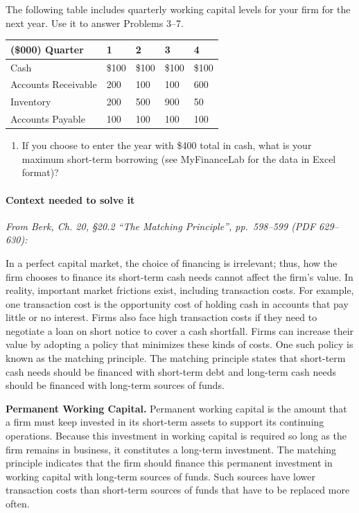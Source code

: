 \documentclass[11pt,a4paper]{article}
\providecommand{\tightlist}{\setlength{\itemsep}{0pt}\setlength{\parskip}{0pt}}
\begin{document}
The following table includes quarterly working capital levels for your firm for the next year. Use
it to answer Problems 3--7.

{\def\LTcaptype{none} %
\begin{longtable}[]{@{}lllll@{}}
\toprule\noalign{}
(\$000) Quarter & 1 & 2 & 3 & 4 \\
\midrule\noalign{}
\endhead
\bottomrule\noalign{}
\endlastfoot
Cash & \$100 & \$100 & \$100 & \$100 \\
Accounts Receivable & 200 & 100 & 100 & 600 \\
Inventory & 200 & 500 & 900 & 50 \\
Accounts Payable & 100 & 100 & 100 & 100 \\
\end{longtable}
}

\begin{enumerate}
\def\labelenumi{\arabic{enumi}.}
\setcounter{enumi}{5}
\tightlist
\item
  If you choose to enter the year with \$400 total in cash, what is your maximum short-term
  borrowing (see MyFinanceLab for the data in Excel format)?
\end{enumerate}

\paragraph{Context needed to solve it}

\emph{From Berk, Ch. 20, §20.2 ``The Matching Principle'', pp.~598--599 (PDF 629--630):}

In a perfect capital market, the choice of financing is irrelevant; thus, how the firm chooses to
finance its short-term cash needs cannot affect the firm's value. In reality, important market
frictions exist, including transaction costs. For example, one transaction cost is the opportunity
cost of holding cash in accounts that pay little or no interest. Firms also face high transaction
costs if they need to negotiate a loan on short notice to cover a cash shortfall. Firms can increase
their value by adopting a policy that minimizes these kinds of costs. One such policy is known as
the matching principle. The matching principle states that short-term cash needs should be financed
with short-term debt and long-term cash needs should be financed with long-term sources of funds.

\textbf{Permanent Working Capital.} Permanent working capital is the amount that a firm must keep
invested in its short-term assets to support its continuing operations. Because this investment in
working capital is required so long as the firm remains in business, it constitutes a long-term
investment. The matching principle indicates that the firm should finance this permanent investment
in working capital with long-term sources of funds. Such sources have lower transaction costs than
short-term sources of funds that have to be replaced more often.
\end{document}
